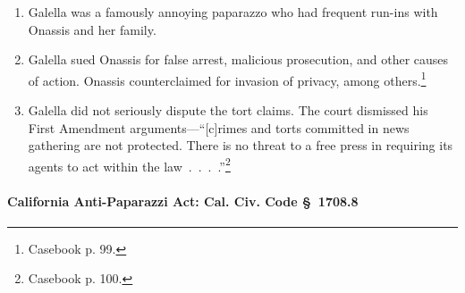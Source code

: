 \begin{enumerate}
    \item Galella was a famously annoying paparazzo who had frequent run-ins 
    with Onassis and her family.
    \item Galella sued Onassis for false arrest, malicious prosecution, and 
    other causes of action. Onassis counterclaimed for invasion of privacy, 
    among others.\footnote{Casebook p. 99.}
    \item Galella did not seriously dispute the tort claims. The court dismissed 
    his First Amendment arguments---``[c]rimes and torts committed in news 
    gathering are not protected. There is no threat to a free press in requiring 
    its agents to act within the law~.~.~.~.''\footnote{Casebook p. 100.}
\end{enumerate}

\paragraph{California Anti-Paparazzi Act: Cal. Civ. Code \S\ 1708.8}

